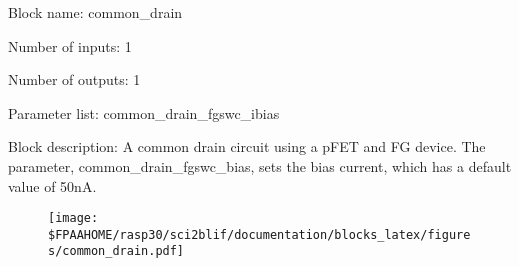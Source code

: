 \pagebreak

Block name: common\_drain

Number of inputs: 1

Number of outputs: 1

Parameter list: common\_drain\_fgswc\_ibias

Block description: 
A common drain circuit using a pFET and FG device. The parameter, common\_drain\_fgswc\_bias, sets the bias current, which has a default value of 50nA.

\begin{figure}[H]  %
\texttt{[image: \$FPAAHOME/rasp30/sci2blif/documentation/blocks\_latex/figures/common\_drain.pdf]}
\end{figure}

